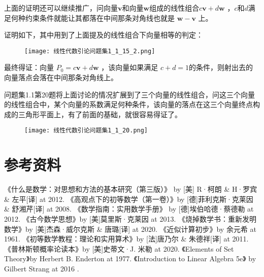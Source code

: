 \documentclass[12pt,oneside]{book}
\begin{document}
上面的证明还可以继续推广，问向量$\boldsymbol{v}$和向量$\boldsymbol{w}$组成的线性组合$c\boldsymbol{v} + d\boldsymbol{w}$ ，$c$和$d$满足何种约束条件就能让其都落在中间那条对角线也就是 $\boldsymbol{w} - \boldsymbol{v}$ 上。

证明如下，其中用到了上面提及的线性组合下向量相等的判定：

\begin{figure}[H]
\centering
\texttt{[image: 线性代数引论问题集1\_1\_15\_2.png]}
\end{figure}

最终得证：向量 $P_0 = c\boldsymbol{v}+d\boldsymbol{w}$ ，该向量如果满足 $c+d=1$的条件，则射出去的向量落点会落在中间那条对角线上。


\cite{线性代数引论}问题集1.1第20题将上面讨论的情况扩展到了三个向量的线性组合，问这三个向量的线性组合中，某个向量的系数满足何种条件，该向量的落点在这三个向量终点构成的三角形平面上，有了前面的基础，就很容易得证了。


\begin{figure}[H]
\centering
\texttt{[image: 线性代数引论问题集1\_1\_20.png]}
\end{figure}



\backmatter
\part*{参考资料}
\begin{thebibliography}{99}
 《什么是数学：对思想和方法的基本研究（第三版）》 by [美] R·柯朗 \& H·罗宾 \&  左平[译]  at 2012.
 《高观点下的初等数学（第一卷）》by [德]菲利克斯·克莱因 \& 舒湘芹[译] at 2008.
 《数学指南：实用数学手册》 by [德]埃伯哈德·蔡德勒 at 2012. 
 《古今数学思想》by [美]莫里斯·克莱因 at 2013.
 《烧掉数学书：重新发明数学》by [美]杰森·威尔克斯 \& 唐璐[译] at 2020.
 《近似计算初步》by 余元希 at 1961.
 《初等数学教程：理论和实用算术》by [法]唐乃尔 \& 朱德祥[译] at 2011.
 《普林斯顿概率论读本》by [美]史蒂文·J. 米勒 at 2020.
 《Elements of Set Theory》by Herbert B. Enderton at 1977.
 《Introduction to Linear Algebra 5e》 by Gilbert Strang at 2016 .
\end{thebibliography}
\end{document}
